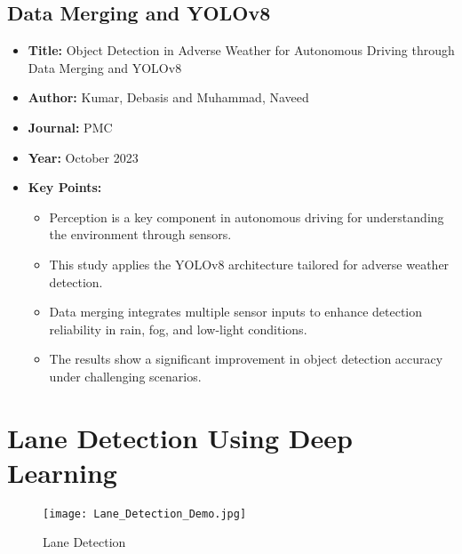 \subsection{Data Merging and YOLOv8}
\begin{itemize}
    \item \textbf{Title:} Object Detection in Adverse Weather for Autonomous Driving through Data Merging and YOLOv8 \cite{kumar2023object}
    \item \textbf{Author:} Kumar, Debasis and Muhammad, Naveed
    \item \textbf{Journal:} PMC
    \item \textbf{Year:} October 2023
    \item \textbf{Key Points:}
    \begin{itemize}
        \item Perception is a key component in autonomous driving for understanding the environment through sensors.
        \item This study applies the YOLOv8 architecture tailored for adverse weather detection.
        \item Data merging integrates multiple sensor inputs to enhance detection reliability in rain, fog, and low-light conditions.
        \item The results show a significant improvement in object detection accuracy under challenging scenarios.
    \end{itemize}
\end{itemize}

\section{Lane Detection Using Deep Learning}


\begin{figure}[h]
	\centering
	\texttt{[image: Lane\_Detection\_Demo.jpg]}
	\caption{Lane Detection}
	\label{fig: img2}
\end{figure}

